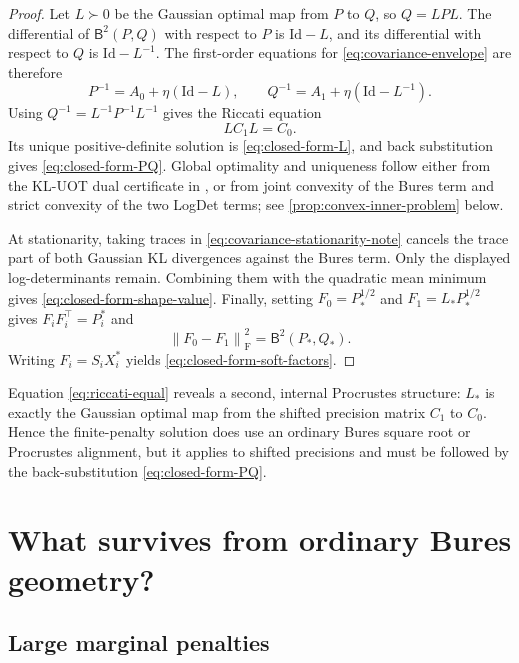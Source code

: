 \documentclass[11pt]{article}
\theoremstyle{definition}
\theoremstyle{remark}
\newcommand{\Id}{\mathrm{Id}}
\newcommand{\BW}{\mathsf B}
\newcommand{\norm}[1]{\left\lVert #1\right\rVert}
\begin{document}
\begin{proof}
Let $L\succ0$ be the Gaussian optimal map from $P$ to $Q$, so $Q=LPL$.
The differential of $\BW^2(P,Q)$ with respect to $P$ is $\Id-L$, and its
differential with respect to $Q$ is $\Id-L^{-1}$. The first-order equations
for \eqref{eq:covariance-envelope} are therefore
\begin{equation}\label{eq:covariance-stationarity-note}
 P^{-1}=A_0+\eta(\Id-L),
 \qquad
 Q^{-1}=A_1+\eta(\Id-L^{-1}).
\end{equation}
Using $Q^{-1}=L^{-1}P^{-1}L^{-1}$ gives the Riccati equation
\begin{equation}\label{eq:riccati-equal}
 LC_1L=C_0.
\end{equation}
Its unique positive-definite solution is \eqref{eq:closed-form-L}, and back
substitution gives \eqref{eq:closed-form-PQ}. Global optimality and uniqueness
follow either from the KL-UOT dual certificate in \citet{YangZhang2026}, or
from joint convexity of the Bures term and strict convexity of the two LogDet
terms; see \cref{prop:convex-inner-problem} below.

At stationarity, taking traces in \eqref{eq:covariance-stationarity-note}
cancels the trace part of both Gaussian KL divergences against the Bures term.
Only the displayed log-determinants remain. Combining them with the quadratic
mean minimum gives \eqref{eq:closed-form-shape-value}. Finally, setting
$F_0=P_*^{1/2}$ and $F_1=L_*P_*^{1/2}$ gives
$F_iF_i^\top=P_i^*$ and
\[
 \norm{F_0-F_1}_{\mathrm F}^2=\BW^2(P_*,Q_*).
\]
Writing $F_i=S_iX_i^*$ yields \eqref{eq:closed-form-soft-factors}.
\end{proof}

Equation \eqref{eq:riccati-equal} reveals a second, internal Procrustes
structure: $L_*$ is exactly the Gaussian optimal map from the shifted precision
matrix $C_1$ to $C_0$. Hence the finite-penalty solution does use an ordinary
Bures square root or Procrustes alignment, but it applies to shifted
precisions and must be followed by the back-substitution
\eqref{eq:closed-form-PQ}.

\section{What survives from ordinary Bures geometry?}

\subsection{Large marginal penalties}
\end{document}
